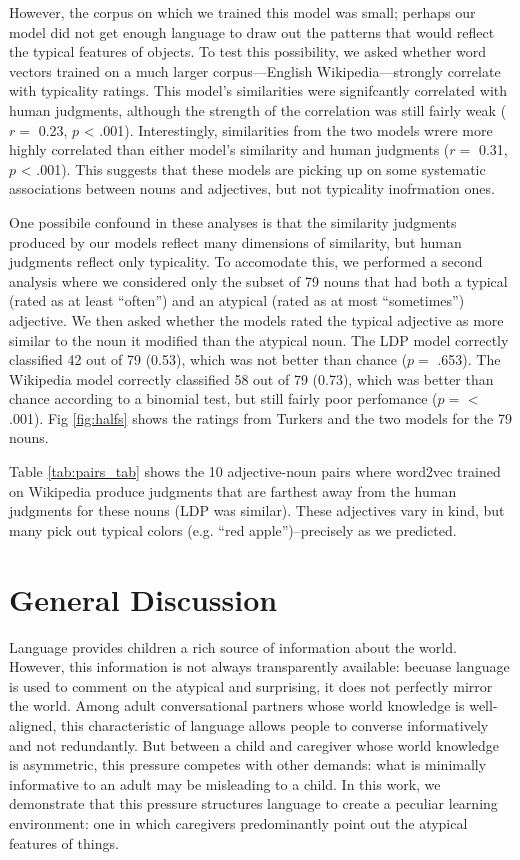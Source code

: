 \documentclass[10pt, letterpaper]{article}
\begin{document}
However, the corpus on which we trained this model was small; perhaps
our model did not get enough language to draw out the patterns that
would reflect the typical features of objects. To test this possibility,
we asked whether word vectors trained on a much larger corpus---English
Wikipedia---strongly correlate with typicality ratings. This model's
similarities were signifcantly correlated with human judgments, although
the strength of the correlation was still fairly weak (\(r =\) 0.23,
\(p\) \textless{} .001). Interestingly, similarities from the two models
wrere more highly correlated than either model's similarity and human
judgments (\(r =\) 0.31, \(p\) \textless{} .001). This suggests that
these models are picking up on some systematic associations between
nouns and adjectives, but not typicality inofrmation ones.

One possibile confound in these analyses is that the similarity
judgments produced by our models reflect many dimensions of similarity,
but human judgments reflect only typicality. To accomodate this, we
performed a second analysis where we considered only the subset of 79
nouns that had both a typical (rated as at least ``often'') and an
atypical (rated as at most ``sometimes'') adjective. We then asked
whether the models rated the typical adjective as more similar to the
noun it modified than the atypical noun. The LDP model correctly
classified 42 out of 79 (0.53), which was not better than chance
(\(p =\) .653). The Wikipedia model correctly classified 58 out of 79
(0.73), which was better than chance according to a binomial test, but
still fairly poor perfomance (\(p =\) \textless{} .001). Fig
\ref{fig:halfs} shows the ratings from Turkers and the two models for
the 79 nouns.

Table \ref{tab:pairs_tab} shows the 10 adjective-noun pairs where
word2vec trained on Wikipedia produce judgments that are farthest away
from the human judgments for these nouns (LDP was similar). These
adjectives vary in kind, but many pick out typical colors (e.g. ``red
apple'')--precisely as we predicted.

\hypertarget{general-discussion}{%
\section{General Discussion}\label{general-discussion}}

Language provides children a rich source of information about the world.
However, this information is not always transparently available: becuase
language is used to comment on the atypical and surprising, it does not
perfectly mirror the world. Among adult conversational partners whose
world knowledge is well-aligned, this characteristic of language allows
people to converse informatively and not redundantly. But between a
child and caregiver whose world knowledge is asymmetric, this pressure
competes with other demands: what is minimally informative to an adult
may be misleading to a child. In this work, we demonstrate that this
pressure structures language to create a peculiar learning environment:
one in which caregivers predominantly point out the atypical features of
things.
\end{document}
